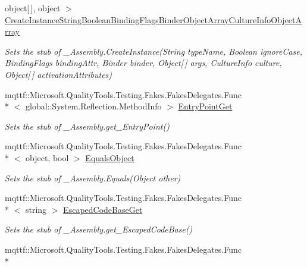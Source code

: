 \begin{DoxyCompactItemize}
object\mbox{[}$\,$\mbox{]}, object $>$ \hyperlink{class_system_1_1_runtime_1_1_interop_services_1_1_fakes_1_1_stub___assembly_aee8078aa87f61cff0caa82fbffc129a5}{Create\-Instance\-String\-Boolean\-Binding\-Flags\-Binder\-Object\-Array\-Culture\-Info\-Object\-Array}
\begin{DoxyCompactList}\small\item\em Sets the stub of \-\_\-\-Assembly.\-Create\-Instance(\-String type\-Name, Boolean ignore\-Case, Binding\-Flags binding\-Attr, Binder binder, Object\mbox{[}$\,$\mbox{]} args, Culture\-Info culture, Object\mbox{[}$\,$\mbox{]} activation\-Attributes)\end{DoxyCompactList}\item 
mqttf\-::\-Microsoft.\-Quality\-Tools.\-Testing.\-Fakes.\-Fakes\-Delegates.\-Func\\*
$<$ global\-::\-System.\-Reflection.\-Method\-Info $>$ \hyperlink{class_system_1_1_runtime_1_1_interop_services_1_1_fakes_1_1_stub___assembly_a479a2c03221628d89ad318ba388f676f}{Entry\-Point\-Get}
\begin{DoxyCompactList}\small\item\em Sets the stub of \-\_\-\-Assembly.\-get\-\_\-\-Entry\-Point()\end{DoxyCompactList}\item 
mqttf\-::\-Microsoft.\-Quality\-Tools.\-Testing.\-Fakes.\-Fakes\-Delegates.\-Func\\*
$<$ object, bool $>$ \hyperlink{class_system_1_1_runtime_1_1_interop_services_1_1_fakes_1_1_stub___assembly_a626666fc2360394899fe1398f7d80d11}{Equals\-Object}
\begin{DoxyCompactList}\small\item\em Sets the stub of \-\_\-\-Assembly.\-Equals(\-Object other)\end{DoxyCompactList}\item 
mqttf\-::\-Microsoft.\-Quality\-Tools.\-Testing.\-Fakes.\-Fakes\-Delegates.\-Func\\*
$<$ string $>$ \hyperlink{class_system_1_1_runtime_1_1_interop_services_1_1_fakes_1_1_stub___assembly_aec7d6e88b7f3f94ed5d7e9058440b948}{Escaped\-Code\-Base\-Get}
\begin{DoxyCompactList}\small\item\em Sets the stub of \-\_\-\-Assembly.\-get\-\_\-\-Escaped\-Code\-Base()\end{DoxyCompactList}\item 
mqttf\-::\-Microsoft.\-Quality\-Tools.\-Testing.\-Fakes.\-Fakes\-Delegates.\-Func\\*

\end{DoxyCompactItemize}
